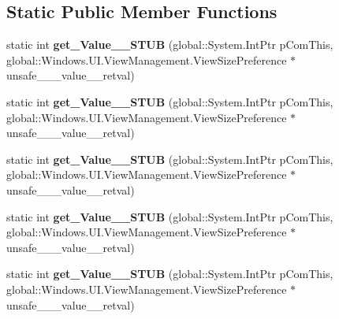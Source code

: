 \subsection*{Static Public Member Functions}
\begin{DoxyCompactItemize}
\item 
\mbox{\label{struct_system_1_1_nullable___a___windows___u_i___view_management___view_size_preference___v_______impl_1_1_vtbl_ac926af984ec4f2d42b7143d61e809cda}} 
static int {\bfseries get\+\_\+\+Value\+\_\+\+\_\+\+S\+T\+UB} (global\+::\+System.\+Int\+Ptr p\+Com\+This, global\+::\+Windows.\+U\+I.\+View\+Management.\+View\+Size\+Preference $\ast$unsafe\+\_\+\+\_\+\+\_\+value\+\_\+\+\_\+retval)
\item 
\mbox{\label{struct_system_1_1_nullable___a___windows___u_i___view_management___view_size_preference___v_______impl_1_1_vtbl_ac926af984ec4f2d42b7143d61e809cda}} 
static int {\bfseries get\+\_\+\+Value\+\_\+\+\_\+\+S\+T\+UB} (global\+::\+System.\+Int\+Ptr p\+Com\+This, global\+::\+Windows.\+U\+I.\+View\+Management.\+View\+Size\+Preference $\ast$unsafe\+\_\+\+\_\+\+\_\+value\+\_\+\+\_\+retval)
\item 
\mbox{\label{struct_system_1_1_nullable___a___windows___u_i___view_management___view_size_preference___v_______impl_1_1_vtbl_ac926af984ec4f2d42b7143d61e809cda}} 
static int {\bfseries get\+\_\+\+Value\+\_\+\+\_\+\+S\+T\+UB} (global\+::\+System.\+Int\+Ptr p\+Com\+This, global\+::\+Windows.\+U\+I.\+View\+Management.\+View\+Size\+Preference $\ast$unsafe\+\_\+\+\_\+\+\_\+value\+\_\+\+\_\+retval)
\item 
\mbox{\label{struct_system_1_1_nullable___a___windows___u_i___view_management___view_size_preference___v_______impl_1_1_vtbl_ac926af984ec4f2d42b7143d61e809cda}} 
static int {\bfseries get\+\_\+\+Value\+\_\+\+\_\+\+S\+T\+UB} (global\+::\+System.\+Int\+Ptr p\+Com\+This, global\+::\+Windows.\+U\+I.\+View\+Management.\+View\+Size\+Preference $\ast$unsafe\+\_\+\+\_\+\+\_\+value\+\_\+\+\_\+retval)
\item 
\mbox{\label{struct_system_1_1_nullable___a___windows___u_i___view_management___view_size_preference___v_______impl_1_1_vtbl_ac926af984ec4f2d42b7143d61e809cda}} 
static int {\bfseries get\+\_\+\+Value\+\_\+\+\_\+\+S\+T\+UB} (global\+::\+System.\+Int\+Ptr p\+Com\+This, global\+::\+Windows.\+U\+I.\+View\+Management.\+View\+Size\+Preference $\ast$unsafe\+\_\+\+\_\+\+\_\+value\+\_\+\+\_\+retval)
\end{DoxyCompactItemize}
